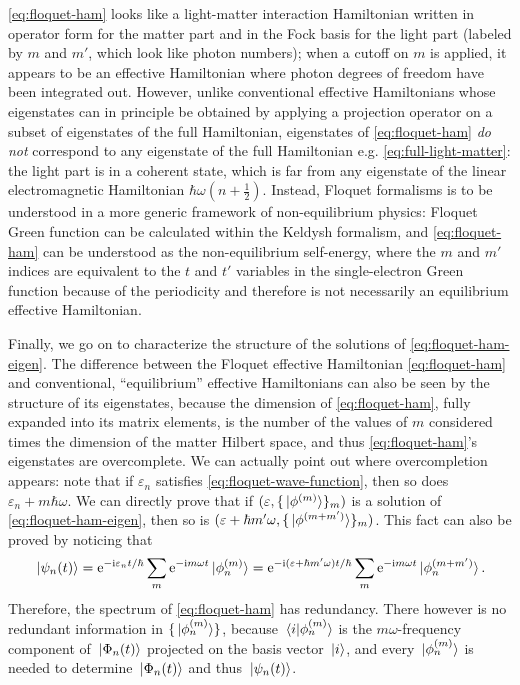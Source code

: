 \documentclass[hyperref, a4paper]{article}
\newcommand*{\ii}{\mathrm{i}}
\newcommand*{\ee}{\mathrm{e}}
\begin{document}
\eqref{eq:floquet-ham} looks like a light-matter interaction Hamiltonian 
written in operator form for the matter part 
and in the Fock basis for the light part (labeled by $m$ and $m'$, which look like photon numbers);
when a cutoff on $m$ is applied, 
it appears to be an effective Hamiltonian where photon degrees of freedom 
have been integrated out.
However, unlike conventional effective Hamiltonians
whose eigenstates can in principle be obtained by 
applying a projection operator on a subset of eigenstates of the full Hamiltonian,
eigenstates of \eqref{eq:floquet-ham} 
\emph{do not} correspond to any eigenstate of 
the full Hamiltonian e.g. \eqref{eq:full-light-matter}:
the light part is in a coherent state,
which is far from any eigenstate of the linear electromagnetic Hamiltonian $\hbar \omega (n + \frac{1}{2})$.
Instead, Floquet formalisms is to be understood in a more generic framework of non-equilibrium physics:
Floquet Green function can be calculated within the Keldysh formalism,
and \eqref{eq:floquet-ham} can be understood as the 
non-equilibrium self-energy, where the $m$ and $m'$ indices are equivalent to the $t$ and $t'$ variables in the single-electron Green function because of the periodicity \cite{lubatsch2019evolution,aoki2014nonequilibrium}
and therefore is not necessarily an equilibrium effective Hamiltonian.

Finally, we go on to characterize the structure of the solutions of  \eqref{eq:floquet-ham-eigen}.
The difference between the Floquet effective Hamiltonian \eqref{eq:floquet-ham}
and conventional, ``equilibrium'' effective Hamiltonians can also be seen  
by the structure of its eigenstates, 
because the dimension of \eqref{eq:floquet-ham}, fully expanded into its matrix elements,
is the number of the values of $m$ considered 
times the dimension of the matter Hilbert space,
and thus \eqref{eq:floquet-ham}'s eigenstates are overcomplete.
We can actually point out where overcompletion appears:
note that if $\varepsilon_n$ satisfies \eqref{eq:floquet-wave-function},
then so does $\varepsilon_n + m \hbar \omega$.
We can directly prove that if $(\varepsilon, \{\ket*{\phi^{(m)}}\}_m)$ 
is a solution of \eqref{eq:floquet-ham-eigen},
then so is $(\varepsilon + \hbar m' \omega, \{\ket*{\phi^{(m + m')}}\}_m)$.
This fact can also be proved by noticing that  
\begin{equation}
    \ket*{\psi_n(t)} = \ee^{- \ii \varepsilon_n t / \hbar} \sum_m \ee^{- \ii m \omega t} \ket*{\phi_n^{(m)}}
    = \ee^{- \ii (\varepsilon + \hbar m' \omega) t / \hbar}
    \sum_m \ee^{- \ii m \omega t} \ket*{\phi_n^{(m + m')}}.
\end{equation}
Therefore, the spectrum of \eqref{eq:floquet-ham} has redundancy. 
There however is no redundant information in $\{\ket*{\phi_n^{(m)}}\}$,
because $\braket*{i}{\phi_n^{(m)}}$ is the 
$m \omega$-frequency component of $\ket*{\Phi_n(t)}$
projected on the basis vector $\ket*{i}$,
and every $\ket*{\phi_n^{(m)}}$ is needed to determine $\ket*{\Phi_n(t)}$
and thus $\ket*{\psi_n(t)}$.
\end{document}
